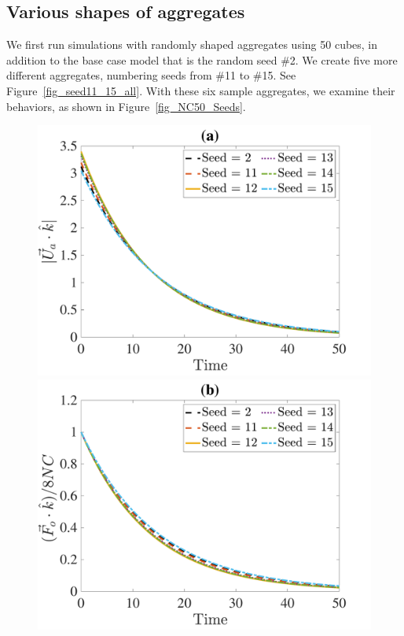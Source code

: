 \subsection{Various shapes of aggregates}
We first run simulations with randomly shaped aggregates using 50 cubes, in addition to the base case model that is the random seed \#2. We create five more different aggregates, numbering seeds from \#11 to \#15. See Figure~\ref{fig_seed11_15_all}.
With these six sample aggregates, we examine their behaviors, as shown in Figure~\ref{fig_NC50_Seeds}.
\begin{figure}[ht]
	\begin{center}
		\includegraphics[scale=0.29]{./figures/fig_NC50_sd_Ua3_all}
		\includegraphics[scale=0.29]{./figures/fig_NC50_sd_Fo3_all}

\end{center}
\end{figure}
